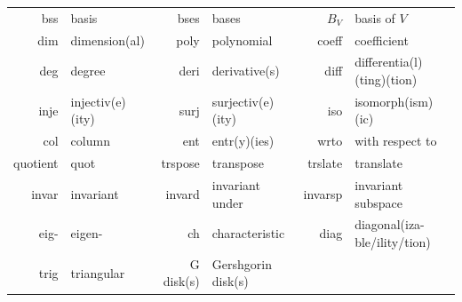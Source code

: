 {\begin{center}
\begin{tabularx}{1.00\textwidth}{
		  r |
		| >{\raggedright\arraybackslash}X | r |
		| >{\raggedright\arraybackslash}X | r |
		| >{\raggedright\arraybackslash}X }
bss&			basis						& bses&			bases						& $B_V$&		basis of $V$\\
dim&			dimension(al)				& poly&			polynomial					& coeff&		coefficient\\
deg&			degree						& deri&			derivative(s)				& diff&			differentia(l)(ting)(tion)\\
inje&			injectiv(e)(ity)			& surj&			surjectiv(e)(ity)			& iso&			isomorph(ism)(ic)\\
col&			column						& ent&			entr(y)(ies)				& wrto&			with respect to\\
quotient&		quot						& trspose&		transpose					& trslate&		translate\\
invar&			invariant					& invard&		invariant under				& invarsp&		invariant subspace\\
eig-&			eigen-						& ch&			characteristic				& diag&			diagonal(iza-ble/ility/tion)\\
trig&			triangular					& G disk(s)&	Gershgorin disk(s)			& &\\
\hline
\end{tabularx}
\end{center}

\clearpage
}{}

\begin{large}




\end{large}


